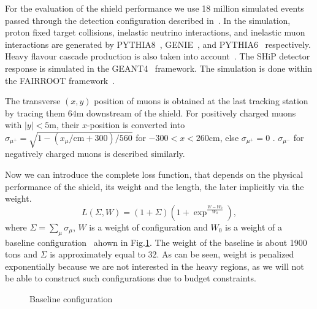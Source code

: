 \documentclass[a4paper]{jpconf}
\theoremstyle{my_theorem_style}
\numberwithin{equation}{section}
\begin{document}
For the evaluation of the shield performance we use 18 million
simulated events passed through the detection configuration described
in~\cite{Akmete:2017bpl}. In the simulation, proton fixed target
collisions,  inelastic neutrino interactions, and  inelastic muon interactions
are generated by PYTHIA8~\cite{Pythia8}, GENIE~\cite{Genie}, and
PYTHIA6~\cite{Pythia6} respectively. 
Heavy flavour cascade production is also taken into
account~\cite{Cascade}.  The SHiP detector response is simulated in
the GEANT4~\cite{Geant4} framework. 
The simulation is done within the FAIRROOT framework~\cite{FAIRROOT}. 

The transverse $(x,y)$ position of muons is obtained at the last
tracking station by tracing them $64\mathrm{m}$ downstream of the
shield. For positively charged muons with $|y| < 5\mathrm{m}$, their
$x$-position is converted into $\sigma_{\mu^+}=  \sqrt{1 - (x_\mu /
  \mathrm{cm} + 300) / 560}$ for $-300< x < 260\mathrm{cm}$, else
$\sigma_{\mu^+} = 0$ \cite{Akmete:2017bpl}.  $\sigma_{\mu^-}$ for
negatively charged muons is described similarly.



Now we can introduce the complete loss function, that depends on the
physical performance of the shield, its weight and the length, the
later  implicitly via the weight.
\[
L(\Sigma, W) = (1 + \Sigma) (1 + \exp^{\frac{W - W_{0}}{W_{0}}}),
\]
where $\Sigma  = \sum_{\mu} \sigma_{\mu}$, $W$ is a weight of
configuration and $W_{0}$ is a weight of a baseline
configuration~\cite{Akmete:2017bpl} ahown in Fig.\ref{fig:baseline}. The weight of the baseline is about 1900 tons and $\Sigma$ is approximately equal to 32. As can be seen, weight is penalized exponentially because we are not interested in the heavy regions, as we will not be able to construct such configurations due to budget constraints.


\begin{figure}[H]
\caption{\label{fig:baseline}Baseline configuration}
\end{figure}
\end{document}
